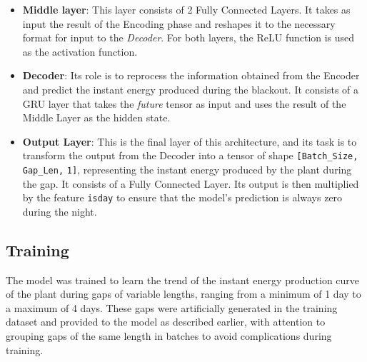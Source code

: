 \begin{itemize}
	\item \textbf{Middle layer}: This layer consists of 2 Fully Connected Layers. It takes as input the result of the Encoding phase and reshapes it to the necessary format for input to the \textit{Decoder}. For both layers, the ReLU function is used as the activation function.

	\item \textbf{Decoder}: Its role is to reprocess the information obtained from the Encoder and predict the instant energy produced during the blackout. It consists of a GRU layer that takes the \textit{future} tensor as input and uses the result of the Middle Layer as the hidden state.

	\item \textbf{Output Layer}: This is the final layer of this architecture, and its task is to transform the output from the Decoder into a tensor of shape \verb|[Batch_Size,| \verb|Gap_Len,| \verb|1]|, representing the instant energy produced by the plant during the gap. It consists of a Fully Connected Layer. Its output is then multiplied by the feature \verb|isday| to ensure that the model's prediction is always zero during the night.
\end{itemize}
\subsection{Training}
The model was trained to learn the trend of the instant energy production curve of
the plant during gaps of variable lengths, ranging from a minimum of 1
day to a maximum of 4 days.
These gaps were artificially generated in the training dataset and provided to the model
as described earlier, with attention to grouping gaps of the same length in
batches to avoid complications during training.

